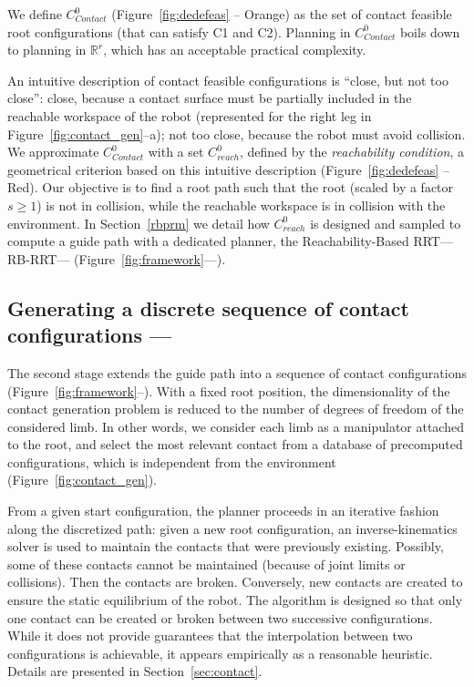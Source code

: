 We define $C_{Contact}^0$ (Figure~\ref{fig:dedefeas} -- Orange) as the set of \gls{contact feasible} root configurations (that can satisfy C1 and C2).
Planning in $C_{Contact}^0$ boils down to planning in $\mathbb{R}^r$, which has an acceptable practical complexity.

An intuitive description of \gls{contact feasible} configurations is ``close, but not too close'': close, because a contact surface must be partially included in the reachable workspace of the robot (represented for the right leg in Figure~\ref{fig:contact_gen}--a); not too close, because the robot must avoid collision.
We approximate $C_{Contact}^0$ with a set $C_{reach}^0$, defined by the \textit{reachability condition}, a geometrical criterion based on this intuitive description (Figure~\ref{fig:dedefeas} -- Red).
Our objective is to find a root path such that the root (scaled by a factor $s \geq 1$) is not in collision, while the reachable workspace is in collision with the environment.
In Section~\ref{rbprm} we detail how  $C_{reach}^0$ is designed and sampled to compute a guide path with a dedicated planner, the Reachability-Based RRT---RB-RRT--- (Figure~\ref{fig:framework}---\Pa).

\subsection{Generating a discrete sequence of contact configurations --- \Pb}

The second stage extends the guide path into a sequence of contact configurations (Figure~\ref{fig:framework}--\Pb).
With a fixed root position, the dimensionality of the 
contact generation problem is reduced to the number of degrees of freedom of the considered limb. In other words, we consider each limb as a manipulator attached to the root, and select the most relevant contact from a database of precomputed configurations, which is independent from the environment (Figure~\ref{fig:contact_gen}).

From a given start configuration, the planner proceeds in an iterative fashion along the discretized path: given a new root configuration, an inverse-kinematics solver 
is used to maintain the contacts that were previously existing. Possibly, some of these contacts cannot be maintained (because of joint limits or collisions).
Then the contacts are broken. Conversely, new contacts are created to ensure the static equilibrium of the robot.
The algorithm is designed so that only one contact can be created or broken between two successive configurations. While it does not provide guarantees that the interpolation between two configurations is achievable, it appears empirically as a reasonable heuristic.
Details are presented in Section~\ref{sec:contact}. 

